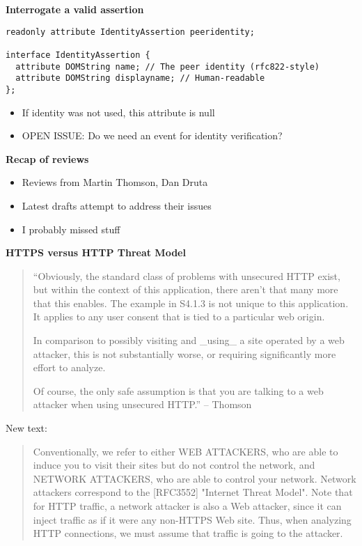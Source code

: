 \documentclass[helvetica]{seminar}
\newcommand{\heading}[1]{%
  \begin{center} 
    \large\bf 
    #1 
  \end{center} 
  \vspace{.4 in}}
\begin{document}
\begin{slide}
\heading{Interrogate a valid assertion}

\begin{verbatim}
readonly attribute IdentityAssertion peeridentity;

interface IdentityAssertion {
  attribute DOMString name; // The peer identity (rfc822-style)
  attribute DOMString displayname; // Human-readable
};
\end{verbatim}

\vspace{1ex}

\begin{itemize}
\item If identity was not used, this attribute is null
\item OPEN ISSUE: Do we need an event for identity verification?
\end{itemize}
\end{slide}



\begin{slide}
\heading{Recap of reviews}

\begin{itemize}
\item Reviews from Martin Thomson, Dan Druta
\item Latest drafts attempt to address their issues
\item I probably missed stuff
\end{itemize}
\end{slide}


\begin{slide}
\heading{HTTPS versus HTTP Threat Model}


{\scriptsize
\begin{quote}
``Obviously, the standard class of problems with unsecured HTTP exist, but
within the context of this application, there aren't that many more that
this enables.  The example in S4.1.3 is not unique to this application.
It applies to any user consent that is tied to a particular web origin.

In comparison to possibly visiting and \_using\_ a site operated by a web
attacker, this is not substantially worse, or requiring significantly
more effort to analyze.

Of course, the only safe assumption is that you are talking to a web
attacker when using unsecured HTTP.'' -- Thomson
\end{quote}

New text:
\begin{quote}
Conventionally, we refer to either WEB ATTACKERS, who are able to
induce you to visit their sites but do not control the network, and
NETWORK ATTACKERS, who are able to control your network.  Network
attackers correspond to the [RFC3552] "Internet Threat Model".  Note
that for HTTP traffic, a network attacker is also a Web attacker,
since it can inject traffic as if it were any non-HTTPS Web site.
Thus, when analyzing HTTP connections, we must assume that traffic is
going to the attacker.
\end{quote}
}
\end{slide}
\end{document}
